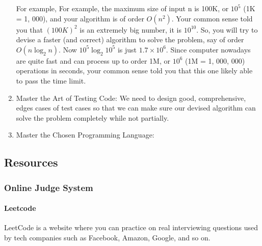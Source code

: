 \documentclass[../main.tex]{subfiles}
\begin{document}
\begin{enumerate}
For example, For example, the maximum size of input n is 100K, or $10^5$ (1K = 1, 000), and your algorithm is of order $O(n^2)$. Your common sense told you that $(100K)^2$ is an extremely big number, it is
$10^10$. So, you will try to devise a faster (and correct) algorithm to solve the problem, say of order $O(n\log_2{n})$. Now $10^5\log_2{10^5}$ is just $1.7\times 10^6$. Since computer nowadays are quite fast and can
process up to order 1M, or $10^6$ (1M = 1, 000, 000) operations in seconds, your common sense told you that this one likely able to pass the time limit.

\item{ Master the Art of Testing Code:}
We need to design good, comprehensive, edges cases of test cases so that we can make sure our devised algorithm can solve the problem completely while not partially. 

\item {Master the Chosen Programming Language:}
\end{enumerate}
\subsection{Resources}
\label{section_resource}
\subsubsection{Online Judge System}
\paragraph{Leetcode} LeetCode is a website where you can practice on real interviewing questions used by tech companies such as Facebook, Amazon, Google, and so on. 
\end{document}
